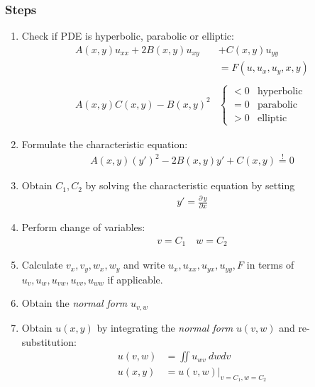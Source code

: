 \subsubsection{Steps}
\begin{enumerate}
    \item Check if PDE is hyperbolic, parabolic or elliptic:
          \begin{align*}
              A(x,y)u_{xx}+2B(x,y)u_{xy} & +C(x,y)u_{yy}          \\
                                         & =F(u,u_x,u_y,x,y)      \\\\
              A(x,y)C(x,y)-{B(x,y)}^2    & \begin{cases}
                                               <0 & \text{hyperbolic} \\
                                               =0 & \text{parabolic}  \\
                                               >0 & \text{elliptic}
                                           \end{cases}
          \end{align*}
    \item Formulate the characteristic equation:
          \begin{align*}
              A(x,y){(y')}^2-2B(x,y)y'+C(x,y)\overset{!}{=} 0
          \end{align*}
    \item Obtain $C_{1},C_{2}$ by solving the characteristic equation by setting
          \begin{align*}
              y'=\frac{\partial\, y}{\partial x}
          \end{align*}
    \item Perform change of variables:
          \begin{align*}
              v = C_{1} \quad w=C_{2}
          \end{align*}
    \item Calculate $v_{x},v_{y},w_{x},w_{y}$
          and write $u_{x},u_{xx},u_{yx},u_{yy},F$ in terms of
          $u_{v},u_{w},u_{vw},u_{vv},u_{ww}$ if applicable.
    \item Obtain the \textit{normal form} $u_{v,w}$
    \item Obtain $u(x,y)$ by integrating the \textit{normal form} $u(v,w)$
          and re-substitution:
          \begin{align*}
              u(v,w) & =\iint u_{wv}\ dwdv         \\
              u(x,y) & =u(v,w)|_{v=C_{1}, w=C_{2}}
          \end{align*}
\end{enumerate}

